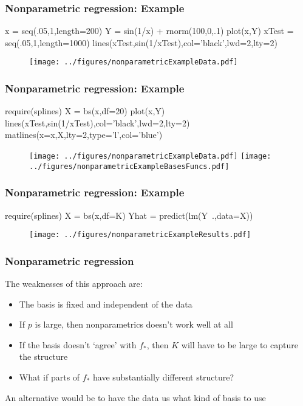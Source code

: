 \documentclass[12pt]{beamer}
\begin{document}
\begin{frame}[fragile]
\frametitle{Nonparametric regression: Example}
\begin{blockcode}
x = seq(.05,1,length=200)
Y = sin(1/x) + rnorm(100,0,.1)
plot(x,Y)
xTest = seq(.05,1,length=1000)
lines(xTest,sin(1/xTest),col='black',lwd=2,lty=2)
\end{blockcode}
\begin{figure}
\centering
\texttt{[image: ../figures/nonparametricExampleData.pdf]}
\end{figure}
\end{frame}

\begin{frame}[fragile]
\frametitle{Nonparametric regression: Example}
\begin{blockcode}
require(splines)
X = bs(x,df=20)
plot(x,Y)
lines(xTest,sin(1/xTest),col='black',lwd=2,lty=2)
matlines(x=x,X,lty=2,type='l',col='blue')
\end{blockcode}
\begin{figure}
\centering
\texttt{[image: ../figures/nonparametricExampleData.pdf]}
\texttt{[image: ../figures/nonparametricExampleBasesFuncs.pdf]}
\end{figure}

\end{frame}



\begin{frame}[fragile]
\frametitle{Nonparametric regression: Example}
\begin{blockcode}
require(splines)
X    = bs(x,df=K)
Yhat = predict(lm(Y~.,data=X))
\end{blockcode}
\begin{figure}
\centering
\texttt{[image: ../figures/nonparametricExampleResults.pdf]}
\end{figure}
\end{frame}

\begin{frame}[fragile]
\frametitle{Nonparametric regression}
The weaknesses of this approach are:
\begin{itemize}
\item The basis is fixed and independent of the data
\item If $p$ is large, then nonparametrics doesn't work well at all 

\item If the basis doesn't `agree' with $f_*$, then $K$ will have to be large to capture the structure
\item What if parts of $f_*$ have substantially different structure?
\end{itemize}
An alternative would be to have the data  us what kind of basis to use
\end{frame}
\end{document}
